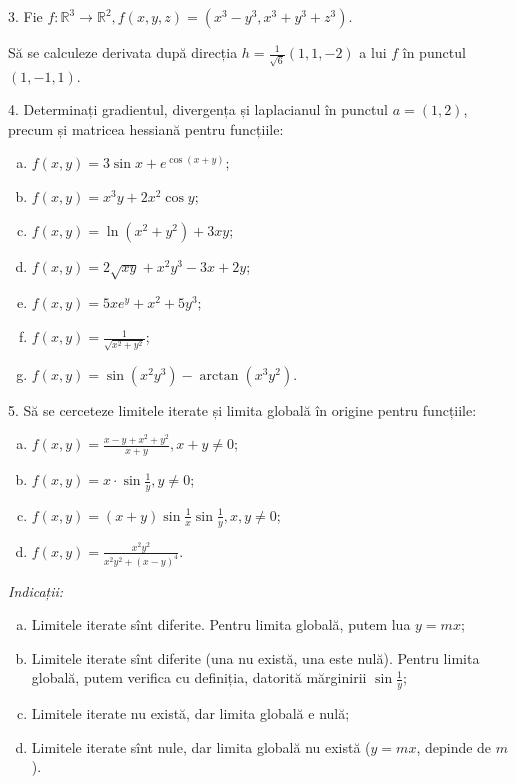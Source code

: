 \documentclass[11pt,a4paper]{article}
\newcommand\RR{\mathbb{R}}
\theoremstyle{dotless}
\theoremstyle{dotlessdr}
\begin{document}
3. Fie $f : \RR^3 \to \RR^2, f(x, y, z) = (x^3 - y^3, x^3 + y^3 + z^3)$.

Să se calculeze derivata după direcția $h = \frac{1}{\sqrt{6}} (1, 1, -2)$ a lui $f$ în
punctul $(1, -1, 1)$.

\vspace{1cm}

4. Determinați gradientul, divergența și laplacianul în punctul
$a = (1, 2)$, precum și matricea hessiană pentru funcțiile:
\begin{enumerate}[(a)]
\item $f(x, y) = 3\sin x + e^{\cos(x + y)}$;
\item $f(x, y) = x^3 y + 2x^2\cos y$;
\item $f(x, y) = \ln(x^2 + y^2) + 3xy$;
\item $f(x, y) = 2\sqrt{xy} + x^2y^3 - 3x + 2y$;
\item $f(x, y) = 5xe^y + x^2 + 5y^3$;
\item $f(x, y) = \frac{1}{\sqrt{x^2 + y^2}}$;
\item $f(x, y) = \sin(x^2y^3) - \arctan (x^3 y^2)$.
\end{enumerate}

\vspace{1cm}

5. Să se cerceteze limitele iterate și limita globală în origine pentru
funcțiile:
\begin{enumerate}[(a)]
\item $f(x, y) = \frac{x - y + x^2 + y^2}{x + y}, x + y \neq 0$;
\item $f(x, y) = x \cdot \sin\frac{1}{y}, y \neq 0$;
\item $f(x, y) = (x + y) \sin \frac{1}{x} \sin \frac{1}{y}, x, y \neq 0$;
\item $f(x, y) = \frac{x^2 y^2}{x^2 y^2 + (x - y)^4}$.
\end{enumerate}

\emph{Indicații:}
\begin{enumerate}[(a)]
\item Limitele iterate sînt diferite. Pentru limita globală, putem lua $y=mx$;
\item Limitele iterate sînt diferite (una nu există, una este nulă). Pentru
  limita globală, putem verifica cu definiția, datorită mărginirii $\sin \frac{1}{y}$;
\item Limitele iterate nu există, dar limita globală e nulă;
\item Limitele iterate sînt nule, dar limita globală nu există ($y = mx$, depinde de $m$).
\end{enumerate}
\end{document}
